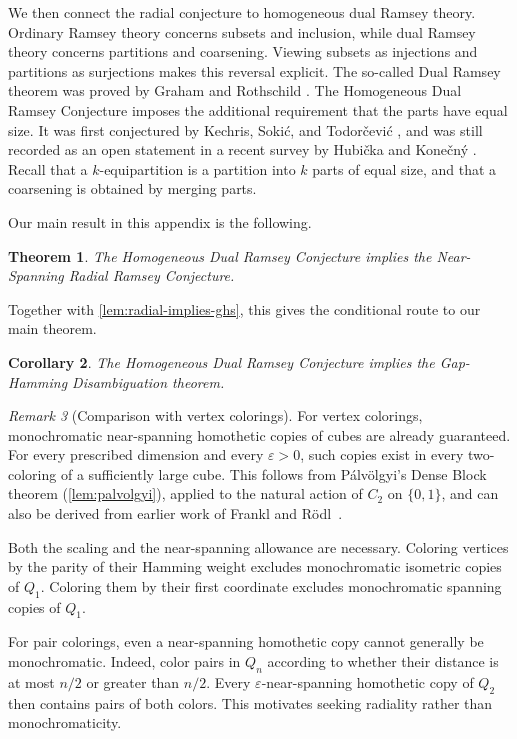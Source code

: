 \documentclass[11pt]{article}
\newtheorem{theorem}{Theorem}
\newtheorem{corollary}[theorem]{Corollary}
\theoremstyle{remark}
\newtheorem{remark}[theorem]{Remark}
\begin{document}
We then connect the radial conjecture to homogeneous dual Ramsey theory.
Ordinary Ramsey theory concerns subsets and inclusion, while dual Ramsey theory concerns partitions and coarsening.
Viewing subsets as injections and partitions as surjections makes this reversal explicit.
The so-called Dual Ramsey theorem was proved by Graham and Rothschild \cite{GR71}.
The Homogeneous Dual Ramsey Conjecture imposes the additional
requirement that the parts have equal size.
It was first conjectured by Kechris, Soki{\'c}, and Todor{\v{c}}evi{\'c} \cite{KST17}, and was still recorded as an open statement in a recent survey by Hubička and Konečný \cite{HK26}.
Recall that a $k$-equipartition is a partition into $k$ parts of equal size, and that a coarsening is obtained by merging parts.

\homogeneousdualramsey*

Our main result in this appendix is the following.

\begin{theorem}\label{thm:hdr-implies-radial}
    The Homogeneous Dual Ramsey Conjecture implies the
    Near-Spanning Radial Ramsey Conjecture.
\end{theorem}

Together with \cref{lem:radial-implies-ghs}, this gives the
conditional route to our main theorem.

\begin{corollary}\label{thm:hdr-implies-main}
    The Homogeneous Dual Ramsey Conjecture implies the
    Gap-Hamming Disambiguation theorem.
\end{corollary}


\begin{remark}[Comparison with vertex colorings]
For vertex colorings, monochromatic near-spanning homothetic copies of cubes are already guaranteed.
For every prescribed dimension and every $\varepsilon>0$, such copies exist in every two-coloring of a sufficiently large cube.
This follows from Pálvölgyi's Dense Block theorem (\cref{lem:palvolgyi}), applied to the natural action of
$C_2$ on $\{0,1\}$, and can also be derived from earlier work of Frankl and Rödl~\cite{FR90}.

Both the scaling and the near-spanning allowance are necessary. Coloring vertices by the parity of their Hamming weight excludes monochromatic isometric copies of $Q_1$. 
Coloring them by their first coordinate excludes monochromatic spanning copies of $Q_1$.

For pair colorings, even a near-spanning homothetic copy cannot generally be monochromatic.
Indeed, color pairs in $Q_n$ according to whether their distance is at most $n/2$ or greater than $n/2$.
Every $\varepsilon$-near-spanning homothetic copy of $Q_2$ then contains pairs of both colors.
This motivates seeking radiality rather than monochromaticity.
\end{remark}
\end{document}
